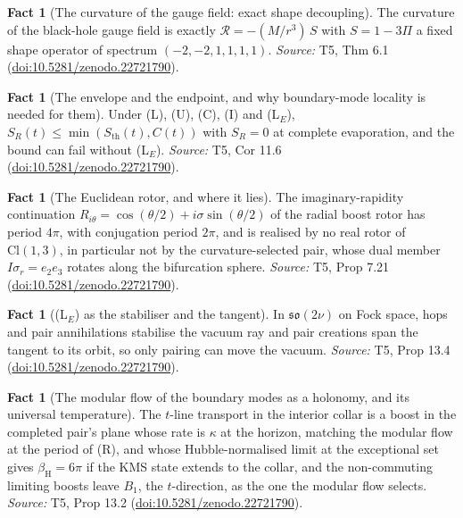 \documentclass[11pt]{article}
\theoremstyle{definition}
\newtheorem{fact}[theorem]{Fact}
\theoremstyle{plain}
\providecommand{\Cl}{}\renewcommand{\Cl}{\mathrm{Cl}}
\providecommand{\Sth}{}\renewcommand{\Sth}{S_{\mathrm{th}}}
\begin{document}
\begin{fact}[The curvature of the gauge field: exact shape decoupling]\label{c:singularity.curvature-gauge-field-exact-shape-decoupling}
The curvature of the black-hole gauge field is exactly $\mathcal{R} = -(M/r^3)\,S$ with $S = 1 - 3\Pi$ a fixed shape operator of spectrum $(-2,-2,1,1,1,1)$.
\emph{Source:} T5, Thm 6.1 (\href{https://doi.org/10.5281/zenodo.22721790}{doi:10.5281/zenodo.22721790}).
\end{fact}

\begin{fact}[The envelope and the endpoint, and why boundary-mode locality is needed for them]\label{c:singularity.envelope-endpoint-why-boundary-mode-locality}
Under (L), (U), (C), (I) and (L$_E$), $S_R(t) \leq \min(\Sth(t), C(t))$ with $S_R = 0$ at complete evaporation, and the bound can fail without (L$_E$).
\emph{Source:} T5, Cor 11.6 (\href{https://doi.org/10.5281/zenodo.22721790}{doi:10.5281/zenodo.22721790}).
\end{fact}

\begin{fact}[The Euclidean rotor, and where it lies]\label{c:singularity.euclidean-rotor-where-it-lies}
The imaginary-rapidity continuation $R_{i\theta} = \cos(\theta/2) + i\sigma\sin(\theta/2)$ of the radial boost rotor has period $4\pi$, with conjugation period $2\pi$, and is realised by no real rotor of $\Cl(1,3)$, in particular not by the curvature-selected pair, whose dual member $I\sigma_r = e_2e_3$ rotates along the bifurcation sphere.
\emph{Source:} T5, Prop 7.21 (\href{https://doi.org/10.5281/zenodo.22721790}{doi:10.5281/zenodo.22721790}).
\end{fact}

\begin{fact}[(L$_E$) as the stabiliser and the tangent]\label{c:singularity.l-stabiliser-tangent}
In $\mathfrak{so}(2\nu)$ on Fock space, hops and pair annihilations stabilise the vacuum ray and pair creations span the tangent to its orbit, so only pairing can move the vacuum.
\emph{Source:} T5, Prop 13.4 (\href{https://doi.org/10.5281/zenodo.22721790}{doi:10.5281/zenodo.22721790}).
\end{fact}

\begin{fact}[The modular flow of the boundary modes as a holonomy, and its universal temperature]\label{c:singularity.modular-flow-boundary-modes-holonomy-universal}
The $t$-line transport in the interior collar is a boost in the completed pair's plane whose rate is $\kappa$ at the horizon, matching the modular flow at the period of (R), and whose Hubble-normalised limit at the exceptional set gives $\beta_{\mathrm{H}} = 6\pi$ if the KMS state extends to the collar, and the non-commuting limiting boosts leave $B_1$, the $t$-direction, as the one the modular flow selects.
\emph{Source:} T5, Prop 13.2 (\href{https://doi.org/10.5281/zenodo.22721790}{doi:10.5281/zenodo.22721790}).
\end{fact}
\end{document}
